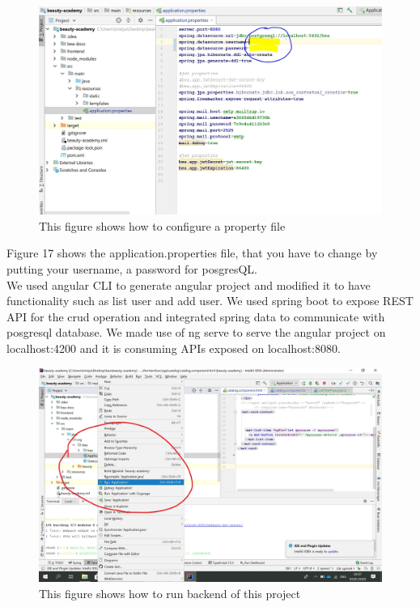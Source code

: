 \documentclass{scrartcl}
\begin{document}


 \begin{figure}[H]
\centering
\includegraphics[width=150mm]{application-properties}
\caption{This figure shows how to configure a property file}
\label{blabla}
\end{figure}
 
 Figure 17 shows the application.properties file, that you have to change by putting your username, a password for posgresQL.\\
 
We used angular CLI to generate angular project and modified it to have functionality such as list user and add user. We used spring boot to expose REST API for the crud operation and integrated spring data to communicate with posgresql database. We made use of ng serve to serve the angular project on localhost:4200 and it is consuming APIs exposed on localhost:8080. 


\begin{figure}[H]
\centering
\includegraphics[width=150mm]{run_backend.JPG}
\caption{This figure shows how to run backend of this project}
\label{blabla}
\end{figure}
\end{document}
